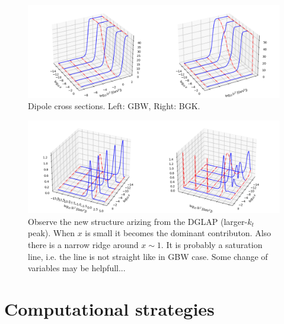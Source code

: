 \documentclass[12pt]{article}
\begin{document}
\begin{figure}
\includegraphics[width=\textwidth]{./dipole1.png}
\caption{Dipole cross sections. Left: GBW, Right: BGK.}
\end{figure}
\begin{figure}
\includegraphics[width=\textwidth]{./gluon1.png}
\caption{Observe the new structure arizing from the DGLAP (larger-$k_t$ peak). When $x$ is small it becomes the dominant contributon. Also there is a narrow ridge around $x\sim1$. It is probably a saturation line, i.e. the line is not straight like in GBW case. {\color{green}Some change of variables may be helpfull...}   }
\end{figure}


\section{Computational strategies}
\end{document}
